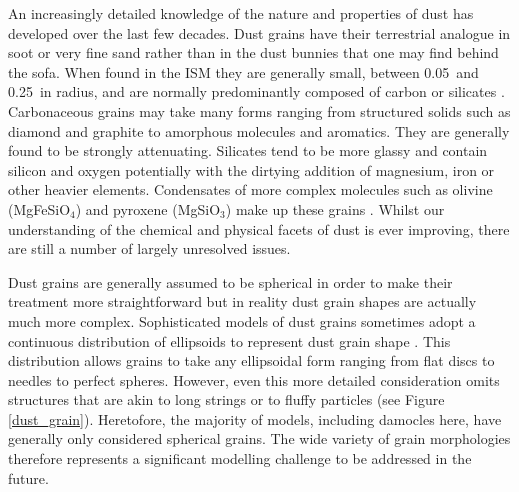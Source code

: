 An increasingly detailed knowledge of the nature and properties of dust has developed over the last few decades. Dust grains have their terrestrial analogue in soot or very fine sand rather than in the dust bunnies that one may find behind the sofa.  When found in the ISM they are generally small, between 0.05\micron\ and 0.25\micron\ in radius, and are normally predominantly composed of carbon or silicates \citep*{Mathis1977}.  Carbonaceous grains may take many forms ranging from structured solids such as diamond and graphite to amorphous molecules and aromatics.  They are generally found to be strongly attenuating.  Silicates tend to be more glassy and contain silicon and oxygen potentially with the dirtying addition of magnesium, iron or other heavier elements.  Condensates of more complex molecules such as olivine (MgFeSiO$_4$) and pyroxene (MgSiO$_3$) make up these grains \citep{Draine1984}.  Whilst our understanding of the chemical and physical facets of dust is ever improving, there are still a number of largely unresolved issues.  %

Dust grains are generally assumed to be spherical in order to make their  treatment more straightforward but in reality dust grain shapes are actually much more complex.  Sophisticated models of dust grains sometimes adopt a continuous distribution of ellipsoids to represent dust grain shape \citep{Bohren1983}.  This distribution allows grains to take any ellipsoidal form ranging from flat discs to needles to perfect spheres.  However, even this more detailed consideration omits structures that are akin to long strings or to fluffy particles (see Figure \ref{dust_grain}). Heretofore, the  majority of models, including {\sc damocles} here, have generally only considered spherical grains.  The wide variety of grain morphologies therefore represents a significant modelling challenge to be addressed in the future.



